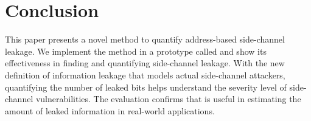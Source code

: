 \section{Conclusion}
This paper presents a novel  %
method to
quantify address-based side-channel leakage. We implement the method in
a prototype called \tool{} and show its effectiveness in finding
and quantifying side-channel leakage. With the new definition of
information leakage that models actual side-channel attackers, quantifying the number of
leaked bits helps understand the severity level
of side-channel vulnerabilities. The evaluation confirms that \tool{} is useful in estimating the amount of leaked information in
real-world applications.
